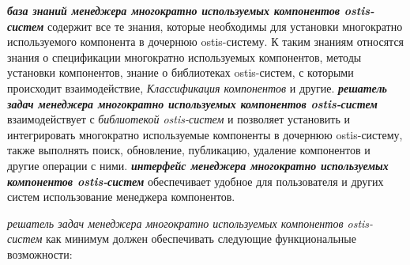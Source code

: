 \textbf{\textit{база знаний менеджера многократно используемых компонентов ostis-систем}} содержит все те знания, которые необходимы для установки многократно используемого компонента в дочернюю ostis-систему. К таким знаниям относятся знания о спецификации многократно используемых компонентов, методы установки компонентов, знание о библиотеках ostis-систем, с которыми происходит взаимодействие, \textit{Классификация компонентов} и другие. \textbf{\textit{решатель задач менеджера многократно используемых компонентов ostis-систем}} взаимодействует с \textit{библиотекой ostis-систем} и позволяет установить и интегрировать многократно используемые компоненты в дочернюю ostis-систему, также выполнять поиск, обновление, публикацию, удаление компонентов и другие операции с ними. \textbf{\textit{интерфейс менеджера многократно используемых компонентов ostis-систем}} обеспечивает удобное для пользователя и других систем использование менеджера компонентов.

\textit{решатель задач менеджера многократно используемых компонентов ostis-систем} как минимум должен обеспечивать следующие функциональные возможности:

